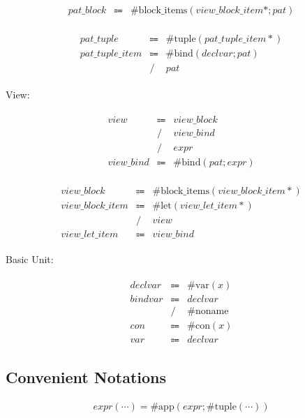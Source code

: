 \begin{align*}
    \begin{array}{rcll}
        \mathit{pat\_block}
        &\Coloneq &\mathrm{\#block\_items}(\mathit{view\_block\_item}{*}; \mathit{pat})
    \end{array}
\end{align*}

\begin{align*}
    \begin{array}{rcll}
        \mathit{pat\_tuple}
        &\Coloneq &\mathrm{\#tuple}(\mathit{pat\_tuple\_item}{*}) \\
        \mathit{pat\_tuple\_item}
        &\Coloneq &\mathrm{\#bind}(\mathit{declvar}; \mathit{pat}) \\
        &\mathrel{/} &\mathit{pat}
    \end{array}
\end{align*}

View:

\begin{align*}
    \begin{array}{rcll}
        \mathit{view}
        &\Coloneq &\mathit{view\_block} \\
        &\mathrel{/} &\mathit{view\_bind} \\
        &\mathrel{/} &\mathit{expr} \\
        \mathit{view\_bind}
        &\Coloneq &\mathrm{\#bind}(\mathit{pat}; \mathit{expr})
    \end{array}
\end{align*}

\begin{align*}
    \begin{array}{rcll}
        \mathit{view\_block}
        &\Coloneq &\mathrm{\#block\_items}(\mathit{view\_block\_item}{*}) \\
        \mathit{view\_block\_item}
        &\Coloneq &\mathrm{\#let}(\mathit{view\_let\_item}{*}) \\
        &\mathrel{/} &\mathit{view} \\
        \mathit{view\_let\_item}
        &\Coloneq &\mathit{view\_bind}
    \end{array}
\end{align*}

Basic Unit:

\begin{align*}
    \begin{array}{rcll}
        \mathit{declvar}
        &\Coloneq &\mathrm{\#var}(x) \\
        \mathit{bindvar}
        &\Coloneq &\mathit{declvar} \\
        &\mathrel{/} &\mathrm{\#noname} \\
        \mathit{con}
        &\Coloneq &\mathrm{\#con}(x) \\
        \mathit{var}
        &\Coloneq &\mathit{declvar}
    \end{array}
\end{align*}

\subsection{Convenient Notations}

\begin{align*}
    \mathit{expr}(\cdots) = \mathrm{\#app}(\mathit{expr}; \mathrm{\#tuple}(\cdots))
\end{align*}
